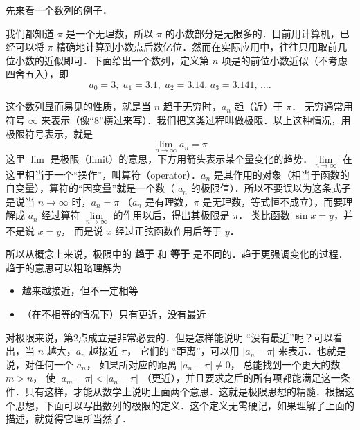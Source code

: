 
先来看一个数列的例子．

\begin{exam}{}
我们都知道 $\pi$ 是一个无理数，所以 $\pi$ 的小数部分是无限多的．目前用计算机，已经可以将 $\pi$ 精确地计算到小数点后数亿位．然而在实际应用中，往往只用取前几位小数的近似即可．下面给出一个数列，定义第 $n$ 项是的前位小数近似（不考虑四舍五入），即
\begin{equation}
{a_0} = 3,\,\,{a_1} = 3.1,\,\,{a_2} = 3.14,\,{a_3} = 3.141,\,\dots.
\end{equation}
\end{exam}

这个数列显而易见的性质，就是当 $n$ 趋于无穷时，$a_n$ 趋（近）于 $\pi$． 无穷通常用符号 $\infty$ 来表示（像“8”横过来写）．我们把这类过程叫做极限．以上这种情况，用极限符号表示，就是
\begin{equation}
\mathop {\lim }\limits_{n \to \infty } {a_n} = \pi 
\end{equation}
这里 $\lim$ 是极限（limit）的意思，下方用箭头表示某个量变化的趋势．$\mathop {\lim }\limits_{n \to \infty }$ 在这里相当于一个“操作”，叫算符（operator）．$a_n$ 是其作用的对象（相当于函数的自变量），算符的“因变量”就是一个数（ $a_n$ 的极限值）．所以不要误以为这条式子是说当 $n \to \infty$ 时，$a_n=\pi$ （$a_n$ 是有理数，$\pi$ 是无理数，等式恒不成立），而要理解成 $a_n$ 经过算符 $\mathop {\lim }\limits_{n \to \infty }$ 的作用以后，得出其极限是 $\pi$． 类比函数 $\sin x = y$，并不是说 $x=y$， 而是说 $x$ 经过正弦函数作用后等于 $y$． 

所以从概念上来说，极限中的 \textbf{趋于} 和 \textbf{等于} 是不同的．趋于更强调变化的过程．趋于的意思可以粗略理解为
\begin{itemize}
\item 越来越接近，但不一定相等
\item （在不相等的情况下）只有更近，没有最近
\end{itemize}

对极限来说，第2点成立是非常必要的．但是怎样能说明 “没有最近”呢？可以看出，当 $n$ 越大，$a_n$ 越接近 $\pi$， 它们的 “距离”，可以用 $\left| {{a_n} - \pi } \right|$ 来表示．也就是说，对任何一个 $a_n$， 如果所对应的距离 $\left| {{a_n} - \pi } \right| \ne 0$， 总能找到一个更大的数 $m>n$， 使 $\left| {{a_m} - \pi } \right| < \left| {{a_n} - \pi } \right|$ （更近），并且要求之后的所有项都能满足这一条件．只有这样，才能从数学上说明上面两个意思．这就是极限思想的精髓．根据这个思想，下面可以写出数列的极限的定义．这个定义无需硬记，如果理解了上面的描述，就觉得它理所当然了．


